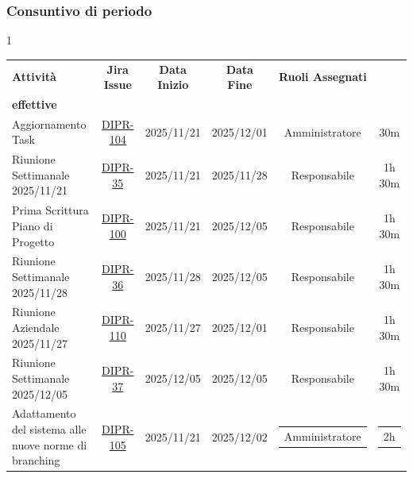 \documentclass[a4paper,12pt]{article}
\begin{document}
\subsubsection{Consuntivo di periodo}

    \small
    \begin{spacing}{1}
        \begin{longtable}{|p{4cm}|c|c|c|c|c|}
            \hline
            \rowcolor{zpusgreen!30}
            \textbf{Attività} & \textbf{Jira Issue} & \textbf{Data Inizio} & \textbf{Data Fine} & \textbf{Ruoli Assegnati} & \begin{tabular}[c]{@{}c@{}} \textbf{Ore} \\ \textbf{effettive} \end{tabular} \\
            \hline
            Aggiornamento Task & \href{https://7zpus.atlassian.net/browse/DIPR-104}{DIPR-104} & 2025/11/21 & 2025/12/01 & Amministratore & 30m \\
            \hline
            Riunione Settimanale 2025/11/21 & \href{https://7zpus.atlassian.net/browse/DIPR-35}{DIPR-35} & 2025/11/21 & 2025/11/28 & Responsabile & 1h 30m\\
            \hline
            Prima Scrittura Piano di Progetto & \href{https://7zpus.atlassian.net/browse/DIPR-100}{DIPR-100} & 2025/11/21 & 2025/12/05 & Responsabile & 1h 30m\\
            \hline
            Riunione Settimanale 2025/11/28 & \href{https://7zpus.atlassian.net/browse/DIPR-36}{DIPR-36} & 2025/11/28 & 2025/12/05 & Responsabile & 1h 30m \\
            \hline
            Riunione Aziendale 2025/11/27 & \href{https://7zpus.atlassian.net/browse/DIPR-110}{DIPR-110} & 2025/11/27 & 2025/12/01 & Responsabile & 1h 30m \\ %
            \hline
            Riunione Settimanale 2025/12/05 & \href{https://7zpus.atlassian.net/browse/DIPR-37}{DIPR-37} & 2025/12/05 & 2025/12/05 & Responsabile & 1h 30m \\ 
            \hline
            Adattamento del sistema alle nuove norme di branching & \href{https://7zpus.atlassian.net/browse/DIPR-105}{DIPR-105} & 2025/11/21 & 2025/12/02  & \begin{tabular}[c]{@{}c@{}} Amministratore \end{tabular} & \begin{tabular}[c]{@{}c@{}} 2h \end{tabular} \\ %

\end{longtable}
\end{spacing}
\end{document}
